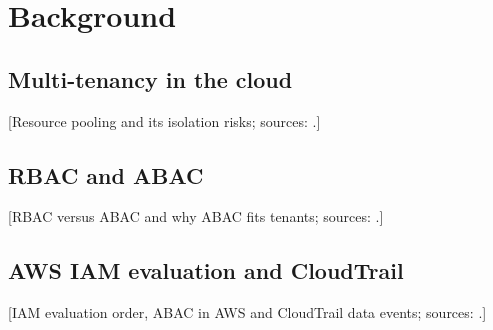 \documentclass[conference]{IEEEtran}
\begin{document}
\section{Background}
\subsection{Multi-tenancy in the cloud}
[Resource pooling and its isolation risks; sources: \cite{nist800145,ristenpart2009}.]
\subsection{RBAC and ABAC}
[RBAC versus ABAC and why ABAC fits tenants; sources: \cite{sandhu1996,nist800162,jin2012}.]
\subsection{AWS IAM evaluation and CloudTrail}
[IAM evaluation order, ABAC in AWS and CloudTrail data events; sources: \cite{awspolicyeval,awsabac,awsdataevents}.]
\end{document}
